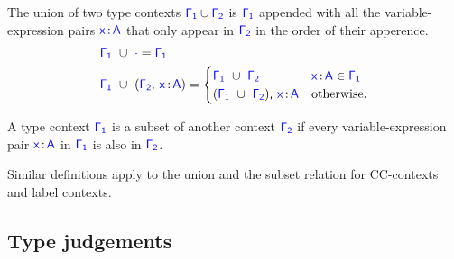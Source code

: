\begin{definition} The union of two type contexts $\target{\Gamma_1} \cup \target{\Gamma_2}$ is $\target{\Gamma_1}$ appended with all the variable-expression pairs $\itemtype{x}{A}$ that only appear in $\target{\Gamma_2}$ in the order of their apperence.
\begin{align*}
	&\target{\Gamma_1}\ \cup\ \target{\cdot} = \target{\Gamma_1}\\
	&\target{\Gamma_1}\ \cup\ (\target{\Gamma_2}\sfcomma \itemtype{x}{A}) = 
	\begin{cases} 
		\target{\Gamma_1}\ \cup\ \target{\Gamma_2} & \itemtype{x}{A} \in \target{\Gamma_1}\\
		(\target{\Gamma_1}\ \cup\ \target{\Gamma_2}) \sfcomma \itemtype{x}{A} & \text{otherwise}.\\
	\end{cases}
\end{align*}
\end{definition}

\begin{definition} A type context $\target{\Gamma_1}$ is a subset of another context $\target{\Gamma_2}$ if every variable-expression pair $\itemtype{x}{A}$ in $\target{\Gamma_1}$ is also in $\target{\Gamma_2}$.
\end{definition}

Similar definitions apply to the union and the subset relation for CC-contexts and label contexts.

\subsection{Type judgements}

